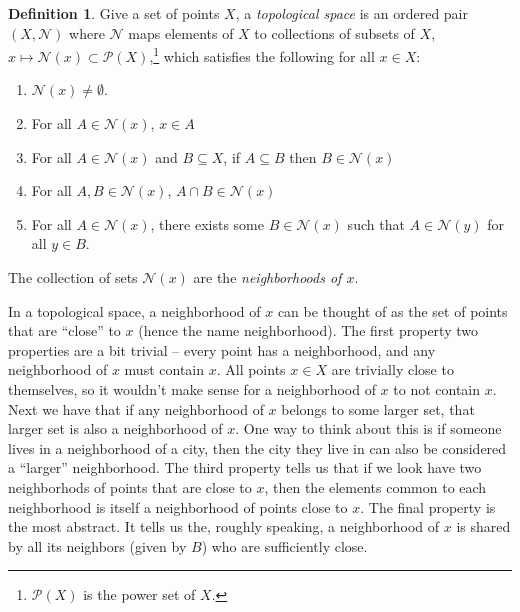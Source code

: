 \documentclass{article}
\theoremstyle{definition}
\newtheorem{definition}{Definition}[section]
\begin{document}
\begin{definition}\label{def}
 Give a set of points $X$, a \textit{\color{red}topological space} is an ordered pair $(X,\mathcal N)$ where $\mathcal N$ maps elements of $X$ to collections of subsets of $X$, $x\mapsto \mathcal N(x)\subset\mathcal P(X)$,\footnote{$\mathcal P(X)$ is the power set of $X$.} which satisfies the following for all $x\in X$:
 \begin{enumerate}
 	\item $\mathcal N(x)\neq \emptyset$.
 	\item For all $A\in \mathcal N(x)$, $x\in A$
 	\item For all $A\in\mathcal N(x)$ and $B\subseteq X$, if $A\subseteq B$ then $B\in \mathcal N(x)$
 	\item For all $A,B\in\mathcal N(x)$, $A\cap B \in\mathcal N(x)$
 	\item For all $A\in \mathcal N(x)$, there exists some $B\in \mathcal N(x)$ such that $A\in\mathcal N(y)$ for all $y\in B$.
 \end{enumerate}
The collection of sets $\mathcal N(x)$ are the \textit{\color{red}neighborhoods of $ x $}. 
\end{definition}

In a topological space, a neighborhood of $x$ can be thought of as the set of points that are ``close'' to $x$ (hence the name neighborhood). The first property two properties are a bit trivial -- every point has a neighborhood, and any neighborhood of $x$ must contain $x$. All points $x\in X$ are trivially close to themselves, so it wouldn't make sense for a neighborhood of $x$ to not contain $x$. Next we have that if any neighborhood of $x$ belongs to some larger set, that larger set is also a neighborhood of $x$. One way to think about this is if someone lives in a neighborhood of a city, then the city they live in can also be considered a ``larger'' neighborhood. The third property tells us that if we look have two neighborhods of points that are close to $x$, then the elements common to each neighborhood is itself a neighborhood of points close to $x$. The final property is the most abstract. It tells us the, roughly speaking, a neighborhood of $x$ is shared by all its neighbors (given by $B$) who are sufficiently close.  
\end{document}

